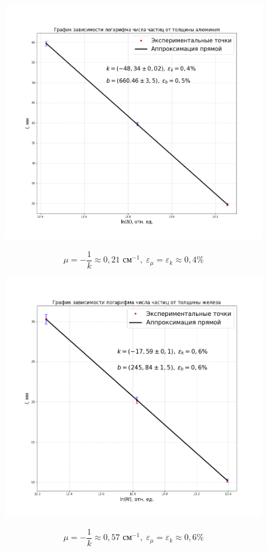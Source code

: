 \documentclass[a4paper,12pt]{article}
\begin{document}
\newpage
\begin{figure}[H]\label{fig: l(lnN)Al}
    \centering
    \includegraphics[width = \textwidth]{l(lnN)Al.png}
\end{figure}

\[\mu = -\frac{1}{k} \approx 0,21 \text{ см}^{-1},\; \varepsilon_\mu = \varepsilon_k \approx 0,4\%\]

\newpage
\begin{figure}[H]\label{fig: l(lnN)Fe}
    \centering
    \includegraphics[width = \textwidth]{l(lnN)Fe.png}
\end{figure}

\[\mu = -\frac{1}{k} \approx 0,57 \text{ см}^{-1},\; \varepsilon_\mu = \varepsilon_k \approx 0,6\%\]
\end{document}
